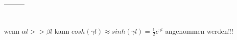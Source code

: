 \begin{tabular}{p{8cm}p{4.5cm}p{5cm}}
\begin{minipage}{8cm}
        \end{minipage} &
		\begin{minipage}{9cm}
        \vspace{0.3cm}
		$\begin{bmatrix}
          	\underline{U}_1\\
          	\underline{I}_1
          \end{bmatrix}=
		  \begin{bmatrix}
          	cosh(\gamma l) & \underline{Z}_W sinh(\gamma l)\\
          	\frac{1}{\underline{Z}_W}sinh(\gamma l) & cosh(\gamma l)
          \end{bmatrix} \cdot
		  \begin{bmatrix}
          	\underline{U}_2\\
          	\underline{I}_2
          \end{bmatrix}$\\
        \end{minipage}
	\end{tabular}\\
		wenn $\alpha l >> \beta l$ kann $cosh(\gamma l)\approx sinh(\gamma
		l)=\frac{1}{2} e^{\gamma l}$ angenommen werden!!!
	

